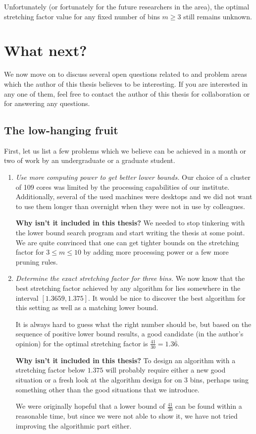 Unfortunately (or fortunately for the future researchers in the area),
the optimal stretching factor value for any fixed number of bins $m
\ge 3$ still remains unknown.

\section{What next?}

We now move on to discuss several open questions related to
\binstretch and problem areas which the author of this thesis believes
to be interesting. If you are interested in any one of them, feel free
to contact the author of this thesis for collaboration or for
answering any questions.

\subsection{The low-hanging fruit}

First, let us list a few problems which we believe can be achieved in
a month or two of work by an undergraduate or a graduate student.

\begin{enumerate}

\item \textit{Use more computing power to get better lower bounds.}
Our choice of a cluster of 109 cores was limited by the processing
capabilities of our institute. Additionally, several of the used
machines were desktops and we did not want to use them longer than
overnight when they were not in use by colleagues.

\noindent\textbf{Why isn't it included in this thesis?} We needed to stop
tinkering with the lower bound search program and start writing the
thesis at some point. We are quite convinced that one can get tighter
bounds on the stretching factor for $3 \le m \le 10$ by adding more
processing power or a few more pruning rules.

\item \textit{Determine the exact stretching factor for three bins.}
We now know that the best stretching factor achieved by any algorithm
for \binstretch lies somewhere in the interval $[1.3659,1.375]$. It
would be nice to discover the best algorithm for this setting as well
as a matching lower bound.

It is always hard to guess what the right number should be, but based
on the sequence of positive lower bound results, a good candidate (in
the author's opinion) for the optimal stretching factor is
$\frac{41}{30} = 1.3\overline{6}$.

\noindent\textbf{Why isn't it included in this thesis?} To design an
algorithm with a stretching factor below $1.375$ will probably require
either a new good situation or a fresh look at the algorithm design
for \binstretch on $3$ bins, perhaps using something other than the
good situations that we introduce.

We were originally hopeful that a lower bound of $\frac{41}{30}$ can
be found within a reasonable time, but since we were not able to show
it, we have not tried improving the algorithmic part either.
\end{enumerate}

